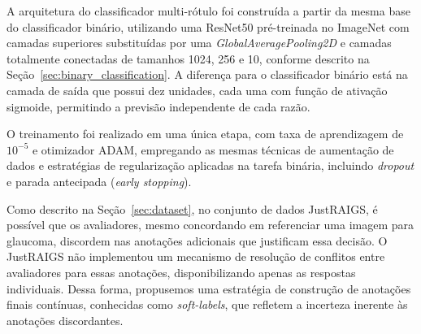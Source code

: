 \documentclass[12pt]{article}
\begin{document}
A arquitetura do classificador multi-rótulo foi construída a partir da mesma base do classificador binário, utilizando uma ResNet50 pré-treinada no ImageNet com camadas superiores substituídas por uma \emph{GlobalAveragePooling2D} e camadas totalmente conectadas de tamanhos 1024, 256 e 10, conforme descrito na Seção~\ref{sec:binary_classification}. A diferença para o classificador binário está na camada de saída que possui dez unidades, cada uma com função de ativação sigmoide, permitindo a previsão independente de cada razão.

O treinamento foi realizado em uma única etapa, com taxa de aprendizagem de $10^{-5}$ e otimizador ADAM, empregando as mesmas técnicas de aumentação de dados e estratégias de regularização aplicadas na tarefa binária, incluindo \emph{dropout} e parada antecipada (\emph{early stopping}).

Como descrito na Seção~\ref{sec:dataset}, no conjunto de dados JustRAIGS, é possível que os avaliadores, mesmo concordando em referenciar uma imagem para glaucoma, discordem nas anotações adicionais que justificam essa decisão. O JustRAIGS não implementou um mecanismo de resolução de conflitos entre avaliadores para essas anotações, disponibilizando apenas as respostas individuais. Dessa forma, propusemos uma estratégia de construção de anotações finais contínuas, conhecidas como \emph{soft-labels}, que refletem a incerteza inerente às anotações discordantes.
\end{document}

